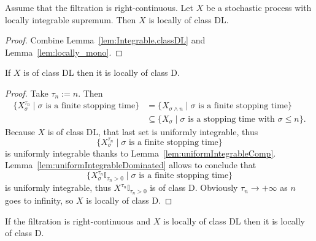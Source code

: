\begin{lemma}\label{lem:HasLocallyIntegrableSup.locally_classDL}
  \leanok
Assume that the filtration is right-continuous. Let $X$ be a stochastic process with locally integrable supremum. Then $X$ is locally of class DL.
\end{lemma}

\begin{proof}
Combine Lemma~\ref{lem:Integrable.classDL} and Lemma~\ref{lem:locally_mono}.
\end{proof}


\begin{lemma}\label{lem:ClassDL.locally_classD}
  \leanok
If $X$ is of class DL then it is locally of class D.
\end{lemma}

\begin{proof}
Take $\tau_n := n$. Then
\begin{align*}
  \{X^{\tau_n}_\sigma \mid \sigma \text{ is a finite stopping time}\} & = \{X_{\sigma \land n} \mid \sigma \text{ is a finite stopping time}\} \\
  & \subseteq \{X_\sigma \mid \sigma \text{ is a stopping time with } \sigma \le n\}.
\end{align*}
Because $X$ is of class DL, that last set is uniformly integrable, thus
$$\{X^{\tau_n}_\sigma \mid \sigma \text{ is a finite stopping time}\}$$
is uniformly integrable thanks to Lemma~\ref{lem:uniformIntegrableComp}. Lemma~\ref{lem:uniformIntegrableDominated} allows to conclude that
$$\{X^{\tau_n}_\sigma \mathbb{I}_{\tau_n > 0} \mid \sigma \text{ is a finite stopping time}\}$$
is uniformly integrable, thus $X^{\tau_n} \mathbb{I}_{\tau_n > 0}$ is of class D. Obviously $\tau_n \rightarrow +\infty$ as $n$ goes to infinity, so $X$ is locally of class D.
\end{proof}


\begin{lemma}\label{lem:locally_classD_of_locally_classDL}
  \leanok
If the filtration is right-continuous and $X$ is locally of class DL then it is locally of class D.
\end{lemma}

